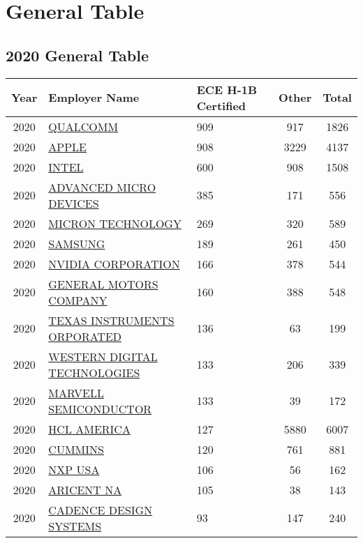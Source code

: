 \documentclass{article}%
\begin{document}
%
\normalsize%
\tableofcontents%
\newpage%
\section{General Table}%
\label{sec:GeneralTable}%
\subsection{2020 General Table}%
\label{subsec:2020GeneralTable}%
\begin{longtable}{c|p{20em}|p{5em}|c|c}%
\hline%
Year&Employer Name&ECE \newline%
 H{-}1B \newline%
 Certified&Other&Total\\%
\hline%
2020&\hyperref[subsec:QUALCOMM]{QUALCOMM}&909&917&1826\\%
\hline%
2020&\hyperref[subsec:APPLE]{APPLE}&908&3229&4137\\%
\hline%
2020&\hyperref[subsec:INTEL]{INTEL}&600&908&1508\\%
\hline%
2020&\hyperref[subsec:ADVANCEDMICRODEVICES]{ADVANCED MICRO DEVICES}&385&171&556\\%
\hline%
2020&\hyperref[subsec:MICRONTECHNOLOGY]{MICRON TECHNOLOGY}&269&320&589\\%
\hline%
2020&\hyperref[subsec:SAMSUNG]{SAMSUNG}&189&261&450\\%
\hline%
2020&\hyperref[subsec:NVIDIACORPORATION]{NVIDIA CORPORATION}&166&378&544\\%
\hline%
2020&\hyperref[subsec:GENERALMOTORSCOMPANY]{GENERAL MOTORS COMPANY}&160&388&548\\%
\hline%
2020&\hyperref[subsec:TEXASINSTRUMENTSORPORATED]{TEXAS INSTRUMENTS ORPORATED}&136&63&199\\%
\hline%
2020&\hyperref[subsec:WESTERNDIGITALTECHNOLOGIES]{WESTERN DIGITAL TECHNOLOGIES}&133&206&339\\%
\hline%
2020&\hyperref[subsec:MARVELLSEMICONDUCTOR]{MARVELL SEMICONDUCTOR}&133&39&172\\%
\hline%
2020&\hyperref[subsec:HCLAMERICA]{HCL AMERICA}&127&5880&6007\\%
\hline%
2020&\hyperref[subsec:CUMMINS]{CUMMINS}&120&761&881\\%
\hline%
2020&\hyperref[subsec:NXPUSA]{NXP USA}&106&56&162\\%
\hline%
2020&\hyperref[subsec:ARICENTNA]{ARICENT NA}&105&38&143\\%
\hline%
2020&\hyperref[subsec:CADENCEDESIGNSYSTEMS]{CADENCE DESIGN SYSTEMS}&93&147&240\\%

\end{longtable}
\end{document}
